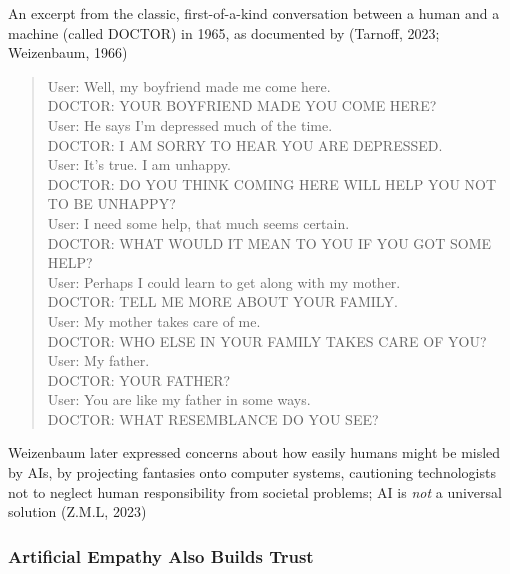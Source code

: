 \documentclass[
  letterpaper,
  DIV=11,
  numbers=noendperiod]{scrartcl}
\begin{document}
An excerpt from the classic, first-of-a-kind conversation between a
human and a machine (called DOCTOR) in 1965, as documented by (Tarnoff,
2023; Weizenbaum, 1966)

\begin{quote}
User: Well, my boyfriend made me come here.\\
DOCTOR: YOUR BOYFRIEND MADE YOU COME HERE?\\
User: He says I'm depressed much of the time.\\
DOCTOR: I AM SORRY TO HEAR YOU ARE DEPRESSED.\\
User: It's true. I am unhappy.\\
DOCTOR: DO YOU THINK COMING HERE WILL HELP YOU NOT TO BE UNHAPPY?\\
User: I need some help, that much seems certain.\\
DOCTOR: WHAT WOULD IT MEAN TO YOU IF YOU GOT SOME HELP?\\
User: Perhaps I could learn to get along with my mother.\\
DOCTOR: TELL ME MORE ABOUT YOUR FAMILY.\\
User: My mother takes care of me.\\
DOCTOR: WHO ELSE IN YOUR FAMILY TAKES CARE OF YOU?\\
User: My father.\\
DOCTOR: YOUR FATHER?\\
User: You are like my father in some ways.\\
DOCTOR: WHAT RESEMBLANCE DO YOU SEE?
\end{quote}

Weizenbaum later expressed concerns about how easily humans might be
misled by AIs, by projecting fantasies onto computer systems, cautioning
technologists not to neglect human responsibility from societal
problems; AI is \emph{not} a universal solution (Z.M.L, 2023)

\subsubsection{Artificial Empathy Also Builds
Trust}\label{artificial-empathy-also-builds-trust}
\end{document}
